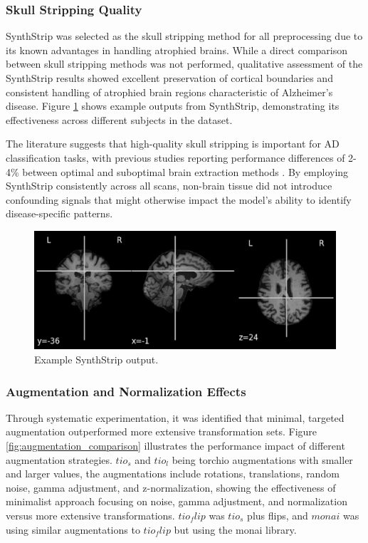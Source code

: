 \documentclass[11pt, a4paper]{article}
\begin{document}
\subsubsection{Skull Stripping Quality}

SynthStrip was selected as the skull stripping method for all preprocessing due to its known advantages in handling atrophied brains. While a direct comparison between skull stripping methods was not performed, qualitative assessment of the SynthStrip results showed excellent preservation of cortical boundaries and consistent handling of atrophied brain regions characteristic of Alzheimer's disease. Figure \ref{fig:skull_stripping_comparison} shows example outputs from SynthStrip, demonstrating its effectiveness across different subjects in the dataset.

The literature suggests that high-quality skull stripping is important for AD classification tasks, with previous studies reporting performance differences of 2-4\% between optimal and suboptimal brain extraction methods \cite{hoopes2022synthstrip}. By employing SynthStrip consistently across all scans, non-brain tissue did not introduce confounding signals that might otherwise impact the model's ability to identify disease-specific patterns.

\begin{figure}[htbp]
  \centering
  \includegraphics[width=\textwidth]{figures/ss.png}
  \caption{Example SynthStrip output.}
  \label{fig:skull_stripping_comparison}
\end{figure}

\subsubsection{Augmentation and Normalization Effects}

Through systematic experimentation, it was identified that minimal, targeted augmentation outperformed more extensive transformation sets. Figure \ref{fig:augmentation_comparison} illustrates the performance impact of different augmentation strategies. $tio_s$ and $tio_l$ being torchio augmentations with smaller and larger values, the augmentations include rotations, translations, random noise, gamma adjustment, and z-normalization, showing the effectiveness of minimalist approach focusing on noise, gamma adjustment, and normalization versus more extensive transformations. $tio_flip$ was $tio_s$ plus flips, and $monai$ was using similar augmentations to $tio_flip$ but using the monai library.
\end{document}
